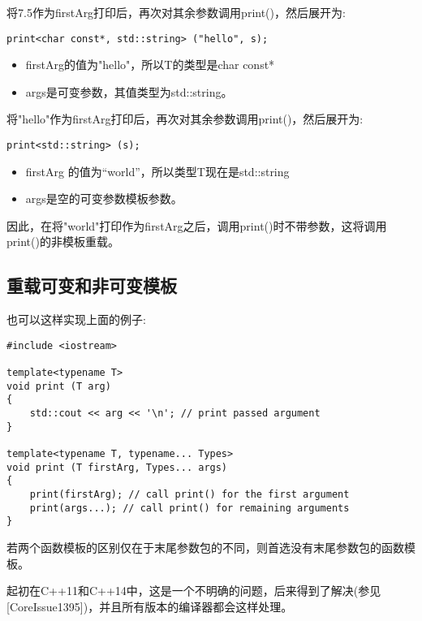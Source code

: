 将7.5作为firstArg打印后，再次对其余参数调用print()，然后展开为:

\begin{lstlisting}[style=styleCXX]
print<char const*, std::string> ("hello", s);
\end{lstlisting}

\begin{itemize}
\item 
firstArg的值为"hello"，所以T的类型是char const*

\item 
args是可变参数，其值类型为std::string。
\end{itemize}

将"hello"作为firstArg打印后，再次对其余参数调用print()，然后展开为:

\begin{lstlisting}[style=styleCXX]
print<std::string> (s);
\end{lstlisting}

\begin{itemize}
\item 
firstArg 的值为“world”，所以类型T现在是std::string

\item 
args是空的可变参数模板参数。
\end{itemize}

因此，在将"world"打印作为firstArg之后，调用print()时不带参数，这将调用print()的非模板重载。

\subsection{重载可变和非可变模板}

也可以这样实现上面的例子:

\begin{lstlisting}[style=styleCXX]
#include <iostream>

template<typename T>
void print (T arg)
{
	std::cout << arg << '\n'; // print passed argument
}

template<typename T, typename... Types>
void print (T firstArg, Types... args)
{
	print(firstArg); // call print() for the first argument
	print(args...); // call print() for remaining arguments
}
\end{lstlisting}

若两个函数模板的区别仅在于末尾参数包的不同，则首选没有末尾参数包的函数模板。

\begin{tcolorbox}[colback=webgreen!5!white,colframe=webgreen!75!black]
\hspace*{0.75cm}起初在C++11和C++14中，这是一个不明确的问题，后来得到了解决(参见[CoreIssue1395])，并且所有版本的编译器都会这样处理。
\end{tcolorbox}

